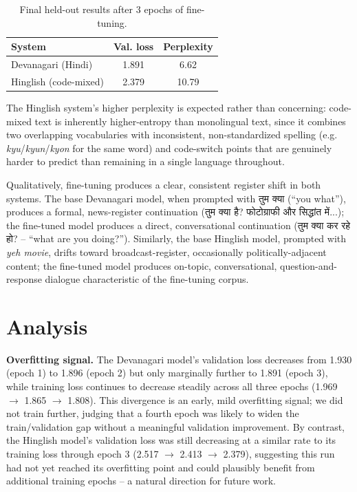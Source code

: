 \documentclass[11pt]{article}
\begin{document}
\begin{table}[h]
\centering
\small
\begin{tabular}{lcc}
\toprule
\textbf{System} & \textbf{Val. loss} & \textbf{Perplexity} \\
\midrule
Devanagari (Hindi) & 1.891 & 6.62 \\
Hinglish (code-mixed) & 2.379 & 10.79 \\
\bottomrule
\end{tabular}
\caption{Final held-out results after 3 epochs of fine-tuning.}
\label{tab:results}
\end{table}

The Hinglish system's higher perplexity is expected rather than concerning: code-mixed text is inherently higher-entropy than monolingual text, since it combines two overlapping vocabularies with inconsistent, non-standardized spelling (e.g. \textit{kyu}/\textit{kyun}/\textit{kyon} for the same word) and code-switch points that are genuinely harder to predict than remaining in a single language throughout.

Qualitatively, fine-tuning produces a clear, consistent register shift in both systems. The base Devanagari model, when prompted with \texthindi{तुम क्या} (``you what''), produces a formal, news-register continuation (\texthindi{तुम क्या है? फोटोग्राफी और सिद्धांत में...}); the fine-tuned model produces a direct, conversational continuation (\texthindi{तुम क्या कर रहे हो?} -- ``what are you doing?''). Similarly, the base Hinglish model, prompted with \textit{yeh movie}, drifts toward broadcast-register, occasionally politically-adjacent content; the fine-tuned model produces on-topic, conversational, question-and-response dialogue characteristic of the fine-tuning corpus.

\section{Analysis}

\textbf{Overfitting signal.} The Devanagari model's validation loss decreases from 1.930 (epoch 1) to 1.896 (epoch 2) but only marginally further to 1.891 (epoch 3), while training loss continues to decrease steadily across all three epochs (1.969 $\to$ 1.865 $\to$ 1.808). This divergence is an early, mild overfitting signal; we did not train further, judging that a fourth epoch was likely to widen the train/validation gap without a meaningful validation improvement. By contrast, the Hinglish model's validation loss was still decreasing at a similar rate to its training loss through epoch 3 (2.517 $\to$ 2.413 $\to$ 2.379), suggesting this run had not yet reached its overfitting point and could plausibly benefit from additional training epochs -- a natural direction for future work.
\end{document}
